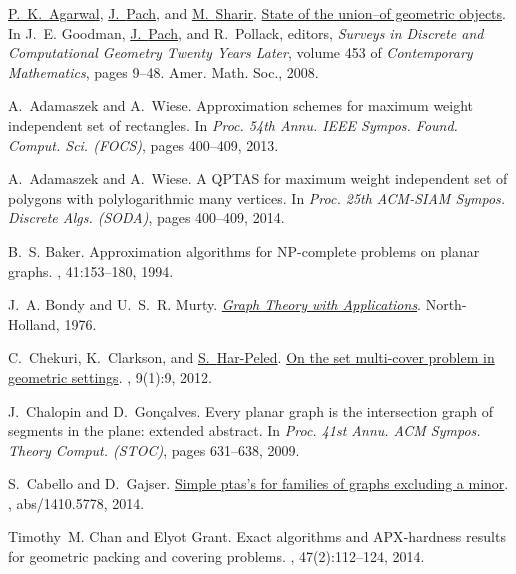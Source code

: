 \documentclass[12pt]{article}
\theoremstyle{remark}\theoremheaderfont{\sf}\theorembodyfont{\upshape}
\numberwithin{figure}{section}\numberwithin{table}{section}\numberwithin{equation}{section}
\begin{document}
{\begin{thebibliography}{vdSOdBV98}
\href{http://www.cs.duke.edu/~pankaj}{P.~K.~{Agarwal}}, \href{http://www.math.nyu.edu/~pach}{J.~{Pach}}, and \href{http://www.math.tau.ac.il/~michas}{M.~{Sharir}}.
\newblock
  \href{https://users.cs.duke.edu/~pankaj/publications/surveys/union.pdf}{State
  of the union--of geometric objects}.
\newblock In J.~E. Goodman, \href{http://www.math.nyu.edu/~pach}{J.~{Pach}}, and R.~Pollack, editors, {\em Surveys in
  Discrete and Computational Geometry Twenty Years Later}, volume 453 of {\em
  Contemporary Mathematics}, pages 9--48. Amer. Math. Soc., 2008.

A.~Adamaszek and A.~Wiese.
\newblock  Approximation schemes for maximum weight independent set of
  rectangles.
\newblock In {\em Proc. 54th Annu. IEEE Sympos. Found. Comput. Sci.
  {\em(FOCS)}}, pages 400--409, 2013.

A.~Adamaszek and A.~Wiese.
\newblock  A {QPTAS} for maximum weight independent set of polygons with
  polylogarithmic many vertices.
\newblock In {\em Proc. 25th ACM-SIAM Sympos. Discrete Algs. {\em(SODA)}},
  pages 400--409, 2014.

B.~S. Baker.
\newblock  Approximation algorithms for {NP}-complete problems on planar
  graphs.
, 41:153--180, 1994.

J.~A. Bondy and U.~S.~R. Murty.
\newblock \href{http://www.ecp6.jussieu.fr/pageperso/bondy/books/gtwa/gtwa\
  .html}{{\em Graph Theory with Applications}}.
\newblock North-Holland, 1976.

C.~Chekuri, K.~Clarkson, and \href{http://sarielhp.org}{S.~{{Har-Peled}}}.
\newblock \href{http://sarielhp.org/papers/08/multi_cover}{On the set
  multi-cover problem in geometric settings}.
, 9(1):9, 2012.

J.~Chalopin and D.~Gon{\c{c}}alves.
\newblock  Every planar graph is the intersection graph of segments in the
  plane: extended abstract.
\newblock In {\em Proc. 41st Annu. ACM Sympos. Theory Comput. {\em(STOC)}},
  pages 631--638, 2009.

S.~Cabello and D.~Gajser.
\newblock \href{http://arxiv.org/abs/1410.5778}{Simple ptas's for families of
  graphs excluding a minor}.
, abs/1410.5778, 2014.

Timothy~M. Chan and Elyot Grant.
\newblock  Exact algorithms and {APX}-hardness results for geometric packing
  and covering problems.
, 47(2):112--124, 2014.


\end{thebibliography}}
\end{document}

